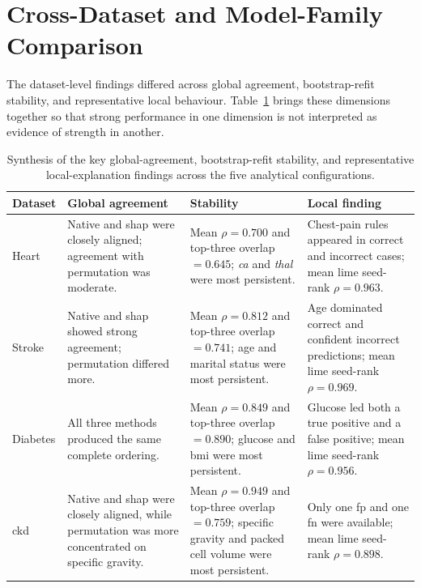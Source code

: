 \section{Cross-Dataset and Model-Family Comparison}

The dataset-level findings differed across global agreement, bootstrap-refit stability, and representative local behaviour. Table~\ref{tab:xai_synthesis} brings these dimensions together so that strong performance in one dimension is not interpreted as evidence of strength in another.

\begin{table}[!t]
    \centering
    \small
    \caption{Synthesis of the key global-agreement, bootstrap-refit stability, and representative local-explanation findings across the five analytical configurations.}
    \label{tab:xai_synthesis}
    \begin{tabularx}{\textwidth}{
        @{}l
        >{\RaggedRight\arraybackslash}X
        >{\RaggedRight\arraybackslash}X
        >{\RaggedRight\arraybackslash}X@{}
    }
        \toprule
        \textbf{Dataset}
        & \textbf{Global agreement}
        & \textbf{Stability}
        & \textbf{Local finding} \\
        \midrule

        Heart
        & Native and \gls{shap} were closely aligned; agreement with
        permutation was moderate.
        & Mean $\rho=0.700$ and top-three overlap $=0.645$; \emph{ca}
        and \emph{thal} were most persistent.
        & Chest-pain rules appeared in correct and incorrect cases;
        mean \gls{lime} seed-rank $\rho=0.963$. \\

        Stroke
        & Native and \gls{shap} showed strong agreement; permutation
        differed more.
        & Mean $\rho=0.812$ and top-three overlap $=0.741$; age and
        marital status were most persistent.
        & Age dominated correct and confident incorrect predictions;
        mean \gls{lime} seed-rank $\rho=0.969$. \\

        Diabetes
        & All three methods produced the same complete ordering.
        & Mean $\rho=0.849$ and top-three overlap $=0.890$; glucose
        and \gls{bmi} were most persistent.
        & Glucose led both a true positive and a false positive;
        mean \gls{lime} seed-rank $\rho=0.956$. \\

        \gls{ckd}
        & Native and \gls{shap} were closely aligned, while permutation
        was more concentrated on specific gravity.
        & Mean $\rho=0.949$ and top-three overlap $=0.759$; specific
        gravity and packed cell volume were most persistent.
        & Only one \gls{fp} and one \gls{fn} were available; mean \gls{lime}
        seed-rank $\rho=0.898$. \\


\end{tabularx}
\end{table}
